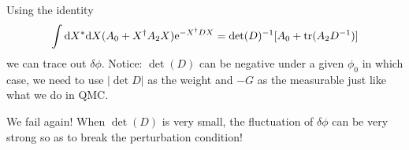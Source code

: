 \documentclass[12pt]{article}
\newcommand{\bea}{\begin{eqnarray}}
\newcommand{\eea}{\end{eqnarray}}
\newcommand{\md}{\mathrm{d}}
\newcommand{\me}{\mathrm{e}}
\begin{document}
Using the identity
\bea \int \md X^* \md X (A_0+X^\dag A_2 X)\me^{-X^\dag D X}=\det(D)^{-1}[A_0+{\rm tr}(A_2D^{-1})] \eea
we can trace out $\delta\phi$. {\color{red} Notice: $\det(D)$ can be negative under a given $\phi_0$ in which case, we need to use $|\det{D}|$ as the weight and $-G$ as the measurable just like what we do in QMC.}

We fail again! When $\det(D)$ is very small, the fluctuation of $\delta\phi$ can be very strong so as to break the perturbation condition!




\end{document}
